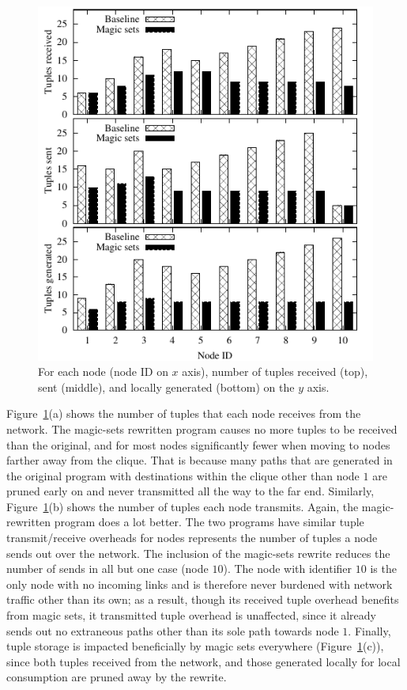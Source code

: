 \begin{figure}
\centering
\includegraphics{figures/magicNumbers}
\ssp
\caption{For each node (node ID on $x$ axis), number of tuples received
  (top), sent (middle), and locally generated (bottom) on the $y$ axis.}
\label{ch:evita:fig:magicresults}
\end{figure}

Figure~\ref{ch:evita:fig:magicresults}(a) shows the number of tuples that each
node receives from the network.  The magic-sets rewritten program causes no
more tuples to be received than the original, and for most nodes significantly
fewer when moving to nodes farther away from the clique.  That is because many
paths that are generated in the original program with destinations within the
clique other than node $1$ are pruned early on and never transmitted all the
way to the far end.  Similarly, Figure~\ref{ch:evita:fig:magicresults}(b) shows
the number of tuples each node transmits.  Again, the magic-rewritten program
does a lot better.  The two programs have similar tuple transmit/receive
overheads for nodes represents the number of tuples a node sends out over the
network.  The inclusion of the magic-sets rewrite reduces the number of sends
in all but one case (node $10$).  The node with identifier $10$ is the only
node with no incoming links and is therefore never burdened with network
traffic other than its own; as a result, though its received tuple overhead
benefits from magic sets, it transmitted tuple overhead is unaffected, since it
already sends out no extraneous paths other than its sole path towards node
$1$.  Finally, tuple storage is impacted beneficially by magic sets everywhere
(Figure~\ref{ch:evita:fig:magicresults}(c)), since both  tuples
received from the network, and those generated locally for local consumption
are pruned away by the rewrite.




